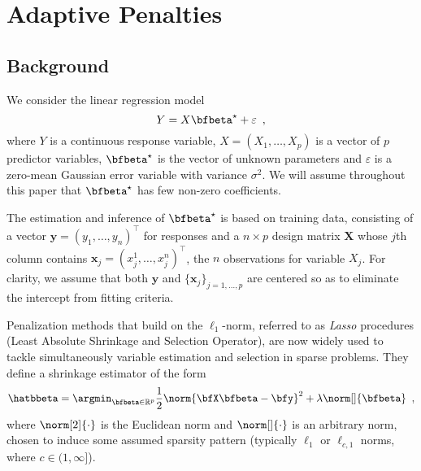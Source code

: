 \section{Adaptive Penalties \label{sec:adaptquadra}}

\subsection{Background}

We consider the linear regression model 
\begin{equation}
  \label{eq:linear_reg_group}
  Y = X \bfbeta^\star + \varepsilon
  \enspace,
\end{equation}
where $Y$ is a continuous response variable, $X=(X_1,\dots,X_p)$ is a vector of
$p$ predictor variables, $\bfbeta^\star$ is the vector of unknown parameters and
$\varepsilon$ is a zero-mean Gaussian error variable with variance $\sigma^2$.
We will assume throughout this paper that $\bfbeta^\star$ has few non-zero
coefficients.

The estimation and inference of $\bfbeta^\star$ is based on training data,
consisting of a vector
$\mathbf{y}=(y_1,\dots,y_n)^\intercal$ for responses and a
$n\times  p$ design  matrix $\mathbf{X}$  whose $j$th  column contains
$\mathbf{x}_j  = (x_j^1,\dots,x_j^n)^\intercal$, the  $n$ observations
for variable $X_j$.  For  clarity, we assume that both $\mathbf{y}$
and $\{\mathbf{x}_j\}_{j=1,\dots,p}$ are centered so as to eliminate the
intercept from fitting criteria.

Penalization methods that build on the $\ell_1$-norm, referred to as
\emph{Lasso} procedures (Least Absolute Shrinkage and Selection Operator), are
now widely used to tackle simultaneously variable estimation and selection in
sparse problems.  They define a shrinkage estimator of the form
\begin{equation}\label{eq:general:original}
  \hatbbeta = \argmin_{\bfbeta\in\mathbb{R}^p} 
    \frac{1}{2} \norm{\bfX \bfbeta - \bfy}^2 + 
    \lambda \norm[]{\bfbeta}
  \enspace, 
\end{equation}
where $\norm[2]{\cdot}$ is the Euclidean norm and $\norm[]{\cdot}$ is an
arbitrary norm, chosen to induce some assumed sparsity pattern (typically
$\ell_1$ or $\ell_{c,1}$ norms, where $c \in (1,\infty]$).
%

